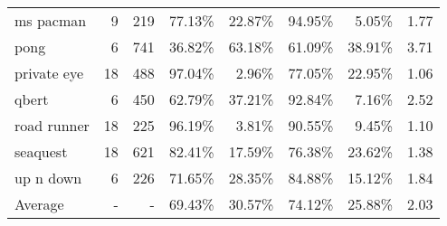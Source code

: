 \begin{table}[h!]
\begin{tabular}{l|rrrrrrr}
    ms pacman & 9 & 219 & 77.13\% & 22.87\% & 94.95\% & 5.05\% & 1.77 \\
    pong & 6 & 741 & 36.82\% & 63.18\% & 61.09\% & 38.91\% & 3.71 \\
    private eye & 18 & 488 & 97.04\% & 2.96\% & 77.05\% & 22.95\% & 1.06 \\
    qbert & 6 & 450 & 62.79\% & 37.21\% & 92.84\% & 7.16\% & 2.52 \\
    road runner & 18 & 225 & 96.19\% & 3.81\% & 90.55\% & 9.45\% & 1.10 \\
    seaquest & 18 & 621 & 82.41\% & 17.59\% & 76.38\% & 23.62\% & 1.38 \\
    up n down & 6 & 226 & 71.65\% & 28.35\% & 84.88\% & 15.12\% & 1.84 \\
    \midrule
    Average & - & - & 69.43\% & 30.57\% & 74.12\% & 25.88\% & 2.03 \\
    \bottomrule
\end{tabular}
\label{tab:option-usage-op6}
\end{table}

